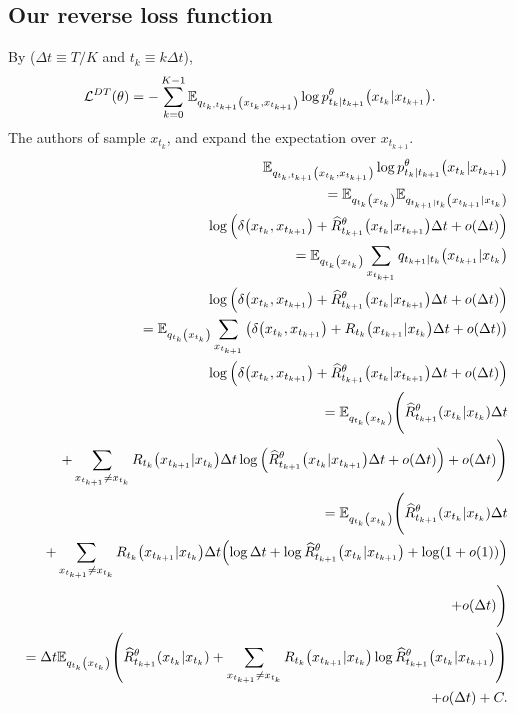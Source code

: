 \documentclass{article}
\begin{document}
\subsection{Our reverse loss function}

By \cite{campbell2022continuous} ($\Delta t\equiv T / K$ and $t_k\equiv k\Delta t$),
\begin{eqnarray*}
  \mathcal{L}^{DT}(\theta) = - \sum_{k=0}^{K - 1} \mathbb{E}_{q_{t_k,t_{k+1}}\qty(x_{t_k},x_{t_{k+1}})}\log p^\theta_{t_k|t_{k+1}}\qty(x_{t_k}|x_{t_{k+1}}).
\end{eqnarray*}
The authors of \cite{campbell2022continuous} sample $x_{t_k}$, and expand the expectation over $x_{t_{k+1}}$.
\begin{eqnarray*}
&&\mathbb{E}_{q_{t_k,t_{k+1}}\qty(x_{t_k},x_{t_{k+1}})}\log p^\theta_{t_k|t_{k+1}}\qty(x_{t_k}|x_{t_{k+1}}) \\
&&=\mathbb{E}_{q_{t_k}\qty(x_{t_k})}\mathbb{E}_{q_{t_{k+1}|t_k}\qty(x_{t_{k+1}}|x_{t_k})}\\
&&\log \qty(\delta\qty(x_{t_k},x_{t_{k+1}}) + \widehat{R}_{t_{k+1}}^\theta\qty(x_{t_k}|x_{t_{k+1}})\Delta t + o(\Delta t)) \\
&&= \mathbb{E}_{q_{t_k}\qty(x_{t_k})}\sum_{x_{t_{k+1}}}q_{t_{k+1}|t_k}\qty(x_{t_{k+1}}|x_{t_k})\\
&&\log \qty(\delta\qty(x_{t_k},x_{t_{k+1}}) + \widehat{R}_{t_{k+1}}^\theta\qty(x_{t_k}|x_{t_{k+1}})\Delta t + o(\Delta t)) \\
&&= \mathbb{E}_{q_{t_k}\qty(x_{t_k})}\sum_{x_{t_{k+1}}}\qty(\delta\qty(x_{t_k},x_{t_{k+1}}) + R_{t_k}\qty(x_{t_{k+1}}|x_{t_k})\Delta t + o(\Delta t)) \\
&&\log \qty(\delta\qty(x_{t_k},x_{t_{k+1}}) + \widehat{R}_{t_{k+1}}^\theta\qty(x_{t_k}|x_{t_{k+1}})\Delta t + o(\Delta t)) \\
&&= \mathbb{E}_{q_{t_k}\qty(x_{t_k})}\Bigg(\widehat{R}_{t_{k+1}}^\theta\qty(x_{t_k}|x_{t_k})\Delta t \\
&&+ \sum_{x_{t_{k+1}}\neq x_{t_k}}R_{t_k}\qty(x_{t_{k+1}}|x_{t_k})\Delta t \log \qty(\widehat{R}_{t_{k+1}}^\theta\qty(x_{t_k}|x_{t_{k+1}})\Delta t + o(\Delta t)) + o(\Delta t)\Bigg) \\
&&= \mathbb{E}_{q_{t_k}\qty(x_{t_k})}\Bigg(\widehat{R}_{t_{k+1}}^\theta\qty(x_{t_k}|x_{t_k})\Delta t \\
&&+ \sum_{x_{t_{k+1}}\neq x_{t_k}}R_{t_k}\qty(x_{t_{k+1}}|x_{t_k})\Delta t \qty(\log\Delta t + \log \widehat{R}_{t_{k+1}}^\theta\qty(x_{t_k}|x_{t_{k+1}}) + \log(1 + o(1))) \\
&&+ o(\Delta t)\Bigg) \\
&&= \Delta t\mathbb{E}_{q_{t_k}\qty(x_{t_k})}\qty(\widehat{R}_{t_{k+1}}^\theta\qty(x_{t_k}|x_{t_k}) + \sum_{x_{t_{k+1}}\neq x_{t_k}}R_{t_k}\qty(x_{t_{k+1}}|x_{t_k}) \log \widehat{R}_{t_{k+1}}^\theta\qty(x_{t_k}|x_{t_{k+1}})) \\
&&+ o(\Delta t) + C.
\end{eqnarray*}
\end{document}
